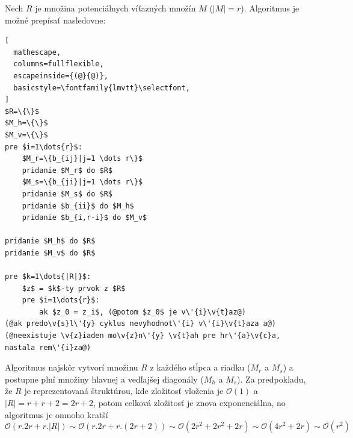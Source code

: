 Nech $R$ je množina potenciálnych víťazných množín $M$ ($|M|=r$).
Algoritmus je možné prepísať nasledovne:
\begin{lstlisting}[
  mathescape,
  columns=fullflexible,
  escapeinside={(@}{@)},
  basicstyle=\fontfamily{lmvtt}\selectfont,
]
$R=\{\}$
$M_h=\{\}$
$M_v=\{\}$
pre $i=1\dots{r}$:
    $M_r=\{b_{ij}|j=1 \dots r\}$
    pridanie $M_r$ do $R$
    $M_s=\{b_{ji}|j=1 \dots r\}$
    pridanie $M_s$ do $R$
    pridanie $b_{ii}$ do $M_h$
    pridanie $b_{i,r-i}$ do $M_v$

pridanie $M_h$ do $R$
pridanie $M_v$ do $R$

pre $k=1\dots{|R|}$:
    $z$ = $k$-ty prvok z $R$
    pre $i=1\dots{r}$:
        ak $z_0 = z_i$, (@potom $z_0$ je v\'{i}\v{t}az@)
(@ak predo\v{s}l\'{y} cyklus nevyhodnot\'{i} v\'{i}\v{t}aza a@)
(@neexistuje \v{z}iaden mo\v{z}n\'{y} \v{t}ah pre hr\'{a}\v{c}a, nastala rem\'{i}za@)
\end{lstlisting}
Algoritmus najskôr vytvorí množinu $R$ z každého stĺpca a riadku ($M_r$ a $M_s$) a postupne plní množiny hlavnej a
vedľajšej diagonály ($M_h$ a $M_s$).
Za predpokladu, že $R$ je reprezentovaná štruktúrou, kde zložitosť vloženia je $\mathcal{O}(1)$ a
$|R| = r + r + 2 = 2r + 2$, potom celková zložitosť je znova exponenciálna, no algoritmus je omnoho kratší
\begin{equation}
    \mathcal{O}(r.2r + r.|R|) \sim \mathcal{O}(r.2r + r.(2r + 2)) \sim \mathcal{O}(2r^2 + 2r^2 + 2r) \sim \mathcal{O}(4r^2 + 2r) \sim \mathcal{O}(r^2)
\end{equation}

